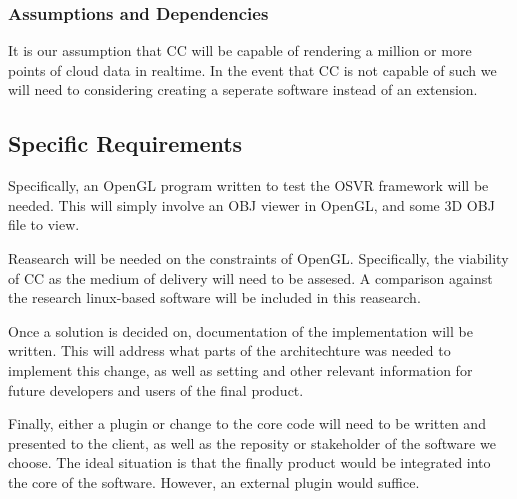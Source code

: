 \subsubsection{Assumptions and Dependencies}

It is our assumption that CC will be capable of rendering a million or more points of cloud data in realtime.
In the event that CC is not capable of such we will need to considering creating a seperate software instead of an extension.

\subsection{Specific Requirements}

Specifically, an OpenGL program written to test the OSVR framework will be needed. This will simply involve an OBJ viewer in OpenGL,
and some 3D OBJ file to view. 

Reasearch will be needed on the constraints of OpenGL. Specifically, the viability of CC as the medium of delivery will need to be
assesed. A comparison against the research linux-based software will be included in this reasearch.

Once a solution is decided on, documentation of the implementation will be written. This will address what parts of
the architechture was needed to implement this change, as well as setting and other relevant information for future developers
and users of the final product. 

Finally, either a plugin or change to the core code will need to be written and presented to the client, as well as the reposity or
stakeholder of the software we choose. The ideal situation is that the finally product would be integrated into the core of the 
software. However, an external plugin would suffice. 

